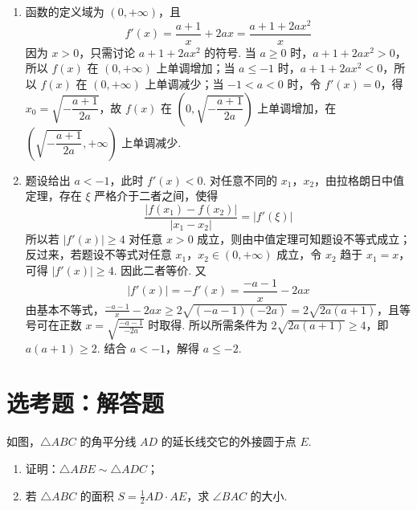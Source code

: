 \begin{solution}
\begin{enumerate}
\item 函数的定义域为 \((0,+\infty)\)，且
\[
f'(x)=\frac{a+1}{x}+2ax=\frac{a+1+2ax^2}{x}
\]
因为 \(x>0\)，只需讨论 \(a+1+2ax^2\) 的符号. 当 \(a\geqslant0\) 时，\(a+1+2ax^2>0\)，所以 \(f(x)\) 在 \((0,+\infty)\) 上单调增加；当 \(a\leqslant-1\) 时，\(a+1+2ax^2<0\)，所以 \(f(x)\) 在 \((0,+\infty)\) 上单调减少；当 \(-1<a<0\) 时，令 \(f'(x)=0\)，得 \(x_0=\sqrt{-\dfrac{a+1}{2a}}\)，故 \(f(x)\) 在 \(\left(0,\sqrt{-\dfrac{a+1}{2a}}\right)\) 上单调增加，在 \(\left(\sqrt{-\dfrac{a+1}{2a}},+\infty\right)\) 上单调减少.
\item 题设给出 \(a<-1\)，此时 \(f'(x)<0\). 对任意不同的 \(x_1\)，\(x_2\)，由拉格朗日中值定理，存在 \(\xi\) 严格介于二者之间，使得
\[
\frac{|f(x_1)-f(x_2)|}{|x_1-x_2|}=|f'(\xi)|
\]
所以若 \(|f'(x)|\geqslant4\) 对任意 \(x>0\) 成立，则由中值定理可知题设不等式成立；反过来，若题设不等式对任意 \(x_1\)，\(x_2\in(0,+\infty)\) 成立，令 \(x_2\) 趋于 \(x_1=x\)，可得 \(|f'(x)|\geqslant4\). 因此二者等价. 又
\[
|f'(x)|=-f'(x)=\frac{-a-1}{x}-2ax
\]
由基本不等式，\(\frac{-a-1}{x}-2ax\geqslant2\sqrt{(-a-1)(-2a)}=2\sqrt{2a(a+1)}\)，且等号可在正数 \(x=\sqrt{\frac{-a-1}{-2a}}\) 时取得. 所以所需条件为 \(2\sqrt{2a(a+1)}\geqslant4\)，即 \(a(a+1)\geqslant2\). 结合 \(a<-1\)，解得 \(a\leqslant-2\).
\end{enumerate}
\end{solution}

\section{选考题：解答题}

\begin{problem}
如图，\(\triangle ABC\) 的角平分线 \(AD\) 的延长线交它的外接圆于点 \(E\).

\begin{enumerate}
\item 证明：\(\triangle ABE \sim \triangle ADC\)；
\item 若 \(\triangle ABC\) 的面积 \(S = \frac{1}{2} AD \cdot AE\)，求 \(\angle BAC\) 的大小.
\end{enumerate}

\end{problem}

